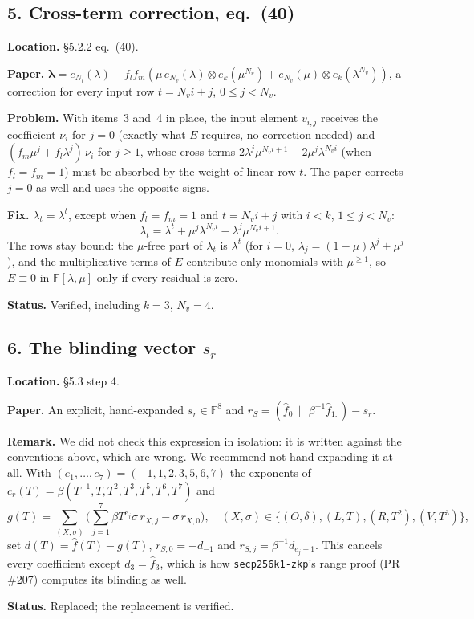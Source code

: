 \documentclass[11pt,a4paper]{article}
\newcommand{\F}{\mathbb{F}}
\newcommand{\blam}{\boldsymbol{\lambda}}
\newcommand{\status}[1]{\par\noindent\textbf{Status.} #1}
\newcommand{\loc}[1]{\par\noindent\textbf{Location.} #1}
\begin{document}
\subsection*{5. Cross-term correction, eq.\ (40)}
\loc{\S5.2.2 eq.~(40).}

\noindent\textbf{Paper.} $\blam = e_{N_l}(\lambda) - f_l f_m\left(\mu\, e_{N_v}(\lambda)
\otimes e_k(\mu^{N_v}) + e_{N_v}(\mu) \otimes e_k(\lambda^{N_v})\right)$, a correction for every
input row $t = N_v i + j$, $0 \le j < N_v$.

\noindent\textbf{Problem.} With items~3 and~4 in place, the input element $v_{i,j}$ receives the
coefficient $\nu_i$ for $j = 0$ (exactly what $E$ requires, no correction needed) and
$(f_m\mu^j + f_l\lambda^j)\,\nu_i$ for $j \ge 1$, whose cross terms
$2\lambda^j\mu^{N_v i+1} - 2\mu^j\lambda^{N_v i}$ (when $f_l = f_m = 1$) must be absorbed by the
weight of linear row $t$. The paper corrects $j = 0$ as well and uses the opposite signs.

\noindent\textbf{Fix.} $\lambda_t = \lambda^t$, except when $f_l = f_m = 1$ and
$t = N_v i + j$ with $i < k$, $1 \le j < N_v$:
\[
  \lambda_t = \lambda^t + \mu^j \lambda^{N_v i} - \lambda^j \mu^{N_v i + 1}.
\]
The rows stay bound: the $\mu$-free part of $\lambda_t$ is $\lambda^t$ (for $i = 0$,
$\lambda_j = (1-\mu)\lambda^j + \mu^j$), and the multiplicative terms of $E$ contribute only
monomials with $\mu^{\ge 1}$, so $E \equiv 0$ in $\F[\lambda, \mu]$ only if every residual is zero.
\status{Verified, including $k = 3$, $N_v = 4$.}

\subsection*{6. The blinding vector $s_r$}
\loc{\S5.3 step 4.}

\noindent\textbf{Paper.} An explicit, hand-expanded $s_r \in \F^8$ and
$r_S = (\hat f_0 \,\|\, \beta^{-1}\hat f_{1:}) - s_r$.

\noindent\textbf{Remark.} We did not check this expression in isolation: it is written against
the conventions above, which are wrong. We recommend not hand-expanding it at all. With
$(e_1, \dots, e_7) = (-1, 1, 2, 3, 5, 6, 7)$ the exponents of
$c_r(T) = \beta(T^{-1}, T, T^2, T^3, T^5, T^6, T^7)$ and
\[
  g(T) = \sum_{(X,\sigma)} \Big(\sum_{j=1}^{7} \beta T^{e_j} \sigma\, r_{X,j}
  - \sigma\, r_{X,0}\Big),\quad
  (X,\sigma) \in \{(O,\delta), (L,T), (R,T^2), (V,T^3)\},
\]
set $d(T) = \hat f(T) - g(T)$, $r_{S,0} = -d_{-1}$ and $r_{S,j} = \beta^{-1} d_{e_j - 1}$. This
cancels every coefficient except $d_3 = \hat f_3$, which is how \texttt{secp256k1-zkp}'s range
proof (PR \#207) computes its blinding as well.
\status{Replaced; the replacement is verified.}
\end{document}

